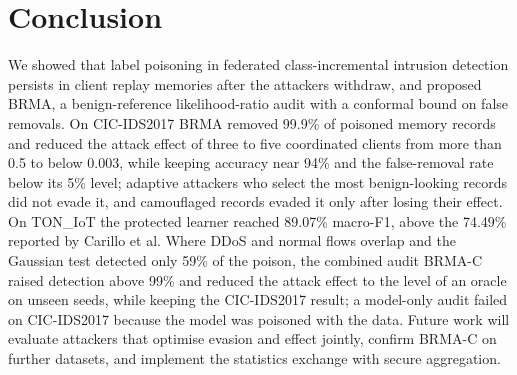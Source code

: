 \documentclass[pdflatex,sn-mathphys-num]{sn-jnl}
\theoremstyle{thmstyleone}
\theoremstyle{thmstylethree}
\begin{document}
\section{Conclusion}\label{sec:conclusion}
We showed that label poisoning in federated class-incremental intrusion detection persists in client replay memories after the attackers withdraw, and proposed BRMA, a benign-reference likelihood-ratio audit with a conformal bound on false removals. On CIC-IDS2017 BRMA removed 99.9\% of poisoned memory records and reduced the attack effect of three to five coordinated clients from more than 0.5 to below 0.003, while keeping accuracy near 94\% and the false-removal rate below its 5\% level; adaptive attackers who select the most benign-looking records did not evade it, and camouflaged records evaded it only after losing their effect. On TON\_IoT the protected learner reached 89.07\% macro-F1, above the 74.49\% reported by Carillo et al. Where DDoS and normal flows overlap and the Gaussian test detected only 59\% of the poison, the combined audit BRMA-C raised detection above 99\% and reduced the attack effect to the level of an oracle on unseen seeds, while keeping the CIC-IDS2017 result; a model-only audit failed on CIC-IDS2017 because the model was poisoned with the data. Future work will evaluate attackers that optimise evasion and effect jointly, confirm BRMA-C on further datasets, and implement the statistics exchange with secure aggregation.

\backmatter
\end{document}
